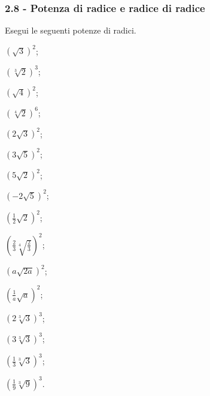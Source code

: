 \subsubsection*{2.8 - Potenza di radice e radice di radice}

\begin{esercizio}[\Ast]
 \label{ese:2.59}
Esegui le seguenti potenze di radici.
 \begin{multicols}{4}
 \begin{enumeratea}
 \item $\left(\sqrt 3\right)^2$;
 \item $\left(\sqrt[3]2\right)^3$;
 \item $\left(\sqrt 4\right)^2$;
 \item $\left(\sqrt[4]2\right)^6$;
 \item $\left(2\sqrt 3\right)^2$;
 \item $\left(3\sqrt 5\right)^2$;
 \item $\left(5\sqrt 2\right)^2$;
 \item $\left(-2\sqrt 5\right)^2$;
 \item $\left(\frac 1 2\sqrt 2\right)^2$;
 \item $\left(\frac 2 3\sqrt[4]{\frac 2 3}\right)^2$;
 \item $\left(a\sqrt{2a}\right)^2$;
 \item $\left(\frac 1 a\sqrt a\right)^2$;
 \item $\left(2\sqrt[3]3\right)^3$;
 \item $\left(3\sqrt[3]3\right)^3$;
 \item $\left(\frac 1 3\sqrt[3]3\right)^3$;
 \item $\left(\frac 1 9\sqrt[3]9\right)^3$.
 \end{enumeratea}
 \end{multicols}
\end{esercizio}

